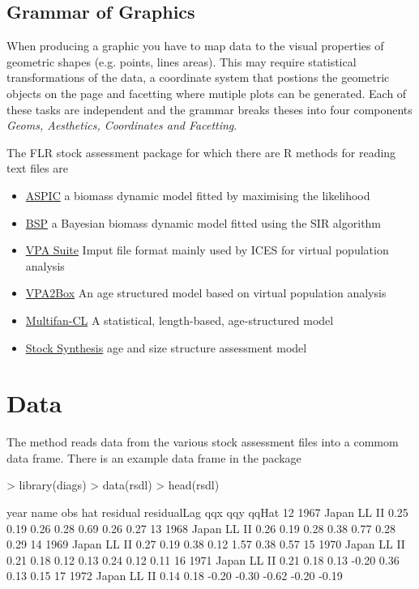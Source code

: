 \documentclass[shortnames,nojss,article]{jss}
\begin{document}
\subsection[gg]{Grammar of Graphics}

When producing a graphic you have to map data to the visual properties of geometric shapes (e.g. points, lines areas). This may require statistical transformations of the data, a coordinate system that postions the geometric objects on the page and facetting where mutiple plots can be generated. Each of these tasks are independent and the grammar breaks theses into four components \emph{Geoms, Aesthetics, Coordinates and Facetting}. 

The FLR stock assessment package for which there are R methods for reading text files are

\begin{itemize}
 \item \href{http://iccat.int/en/AssessCatalog.htm}{ASPIC} a biomass dynamic model fitted by maximising the likelihood 
 \item \href{http://iccat.int/en/AssessCatalog.htm}{BSP}  a Bayesian biomass dynamic model fitted using the SIR algorithm
 \item \href{http://www.ices.dk/committe/acom/wg/asoft/VPA/}{VPA Suite} Imput file format mainly used by ICES for virtual population analysis
 \item \href{http://iccat.int/en/AssessCatalog.htm}{VPA2Box} An age structured model based on virtual population analysis
 \item \href{http://www.multifan-cl.org}{Multifan-CL} A statistical, length-based, age-structured model
 \item \href{http://nft.nefsc.noaa.gov/Stock_Synthesis_3.htm}{Stock Synthesis} age and size structure assessment model
\end{itemize}


\section{Data}

The  method reads data from the various stock assessment files into a commom data frame.
There is an example data frame in the package

\begin{Schunk}
\begin{Sinput}
> library(diags)
> data(rsdl)
> head(rsdl)
\end{Sinput}
\begin{Soutput}
   year        name  obs  hat residual residualLag   qqx   qqy qqHat
12 1967 Japan LL II 0.25 0.19     0.26        0.28  0.69  0.26  0.27
13 1968 Japan LL II 0.26 0.19     0.28        0.38  0.77  0.28  0.29
14 1969 Japan LL II 0.27 0.19     0.38        0.12  1.57  0.38  0.57
15 1970 Japan LL II 0.21 0.18     0.12        0.13  0.24  0.12  0.11
16 1971 Japan LL II 0.21 0.18     0.13       -0.20  0.36  0.13  0.15
17 1972 Japan LL II 0.14 0.18    -0.20       -0.30 -0.62 -0.20 -0.19
\end{Soutput}
\end{Schunk}
\end{document}
